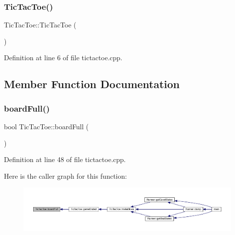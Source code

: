 \subsubsection{\texorpdfstring{Tic\+Tac\+Toe()}{TicTacToe()}}
{\footnotesize\ttfamily Tic\+Tac\+Toe\+::\+Tic\+Tac\+Toe (\begin{DoxyParamCaption}{ }\end{DoxyParamCaption})}



Definition at line 6 of file tictactoe.\+cpp.



\subsection{Member Function Documentation}
\mbox{\label{class_tic_tac_toe_a750e26d95ced2dca83c21279ef43def9}} 
\subsubsection{\texorpdfstring{board\+Full()}{boardFull()}}
{\footnotesize\ttfamily bool Tic\+Tac\+Toe\+::board\+Full (\begin{DoxyParamCaption}{ }\end{DoxyParamCaption})}



Definition at line 48 of file tictactoe.\+cpp.

Here is the caller graph for this function\+:\nopagebreak
\begin{figure}[H]
\begin{center}
\leavevmode
\includegraphics[width=350pt]{class_tic_tac_toe_a750e26d95ced2dca83c21279ef43def9_icgraph}
\end{center}
\end{figure}
\mbox{\label{class_tic_tac_toe_a0ed1b3b4b699af8e7db79f502cbc9531}} 
